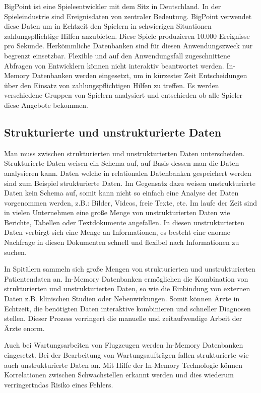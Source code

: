 \documentclass[draft,final]{vutinfth} %
\begin{document}
BigPoint ist eine Spieleentwickler mit dem Sitz in Deutschland. In der Spieleindustrie sind Ereignisdaten von zentraler Bedeutung. BigPoint verwendet diese Daten um in Echtzeit den Spielern in schwierigen Situationen zahlungspflichtige Hilfen anzubieten. Diese Spiele produzieren 10.000 Ereignisse pro Sekunde. Herkömmliche Datenbanken sind für diesen Anwendungszweck nur begrenzt einsetzbar. Flexible und auf den Anwendungsfall zugeschnittene Abfragen von Entwicklern können nicht interaktiv beantwortet werden. In-Memory Datenbanken werden eingesetzt, um in kürzester Zeit Entscheidungen über den Einsatz von zahlungspflichtigen Hilfen zu treffen. Es werden verschiedene Gruppen von Spielern analysiert und entschieden ob alle Spieler diese Angebote bekommen.

\subsection*{Strukturierte und unstrukturierte Daten}
Man muss zwischen strukturierten und unstrukturierten Daten unterscheiden. Strukturierte Daten weisen ein Schema auf, auf Basis dessen man die Daten analysieren kann. Daten welche in relationalen Datenbanken gespeichert werden sind zum Beispiel strukturierte Daten. Im Gegensatz dazu weisen unstrukturierte Daten kein Schema auf, somit kann nicht so einfach eine Analyse der Daten vorgenommen werden, z.B.: Bilder, Videos, freie Texte, etc. Im laufe der Zeit sind in vielen Unternehmen eine gro\ss e Menge von unstrukturierten Daten wie Berichte, Tabellen oder Textdokumente angefallen. In diesen unstrukturierten Daten verbirgt sich eine Menge an Informationen, es besteht eine enorme Nachfrage in diesen Dokumenten schnell und flexibel nach Informationen zu suchen.

In Spitälern sammeln sich gro\ss e Mengen von strukturierten und unstrukturierten Patientendaten an. In-Memory Datenbanken ermöglichen die Kombination von strukturierten und unstrukturierten Daten, so wie die Einbindung von externen Daten z.B. klinischen Studien oder Nebenwirkungen. Somit können Ärzte in Echtzeit, die benötigten Daten interaktive kombinieren und schneller Diagnosen stellen. Dieser Prozess verringert die manuelle und zeitaufwendige Arbeit der Ärzte enorm.

Auch bei Wartungsarbeiten von Flugzeugen werden In-Memory Datenbanken eingesetzt. Bei der Bearbeitung von Wartungsaufträgen fallen strukturierte wie auch unstrukturierte Daten an. Mit Hilfe der In-Memory Technologie können Korrelationen zwischen Schwachstellen erkannt werden und dies wiederum verringertndas Risiko eines Fehlers.
\end{document}
